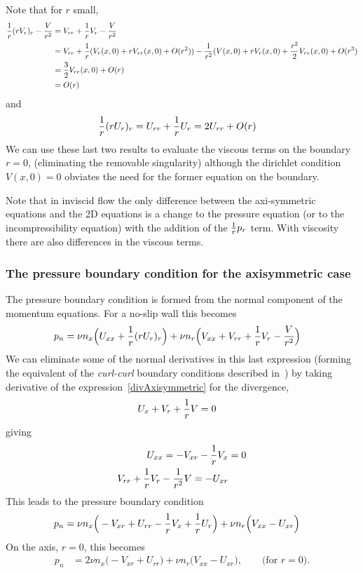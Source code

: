Note that for $r$ small, 
\begin{align*}
{1\over r}( r V_r)_r - {V\over r^2} &= V_{rr} +  {1\over r} V_r - {V\over r^2} \\
      &= V_{rr} + {1\over r}( V_r(x,0) + r V_{rr}(x,0) + O(r^2) ) 
     - {1\over r^2}( V(x,0) + r V_r(x,0) + {r^2\over 2} V_{rr}(x,0) + O(r^3) \\
   &=  {3\over2} V_{rr}(x,0) + O(r) \\
  &= O(r)
\end{align*}
and
\begin{align*}
{1\over r}( r U_r)_r &= U_{rr} + {1\over r} U_r = 2 U_{rr} + O(r)
\end{align*}
We can use these last two results to evaluate the viscous terms on the boundary $r=0$, (eliminating
the removable singularity) although the dirichlet condition $V(x,0)=0$ obviates the need for the former
equation on the boundary.

Note that in inviscid flow the only difference between the axi-symmetric equations and the 2D equations
is a change to the pressure equation (or to the incompressibility equation) with the addition 
of the ${1\over r} p_r$ term. With viscosity there are also differences in the viscous terms.

\subsubsection{The pressure boundary condition for the axisymmetric case}

The pressure boundary condition is formed from the normal component of the momentum equations.
For a no-slip wall this becomes
\begin{align*}
p_n &= \nu n_x\Big( U_{xx} + {1\over r}( r U_r)_r \Big) 
     + \nu n_r\Big( V_{xx} + V_{rr} + {1\over r}V_r - {V\over r^2}\Big) 
\end{align*}
We can eliminate some of the normal derivatives in
this last expression (forming the equivalent of the {\em curl-curl} boundary conditions
described in~\cite{}) by taking derivative of the expression~\eqref{divAxisymmetric} 
for the divergence, 
\begin{align*}
   U_x + V_r + {1\over r} V &=0 
\end{align*}
giving 
\begin{align*}
  U_{xx} = - V_{xr} - {1\over r} V_x &=0 \\
  V_{rr} + {1\over r} V_r - {1\over r^2} V = -U_{xr}
\end{align*}
This leads to the pressure boundary condition
\begin{align}
p_n &= \nu n_x\Big( -V_{xr} + U_{rr} - {1\over r} V_x + {1\over r}U_r \Big) 
     + \nu n_r\Big( V_{xx} - U_{xr}  \Big)   \label{axisSymmetricPressureBC}
\end{align}
On the axis, $r=0$, this becomes
\begin{align*}
p_n &= 2 \nu n_x\Big( -V_{xr} + U_{rr} \Big) 
       + \nu n_r\Big( V_{xx} - U_{xr}  \Big),  \qquad\text{(for $r=0$)}. 
\end{align*}
